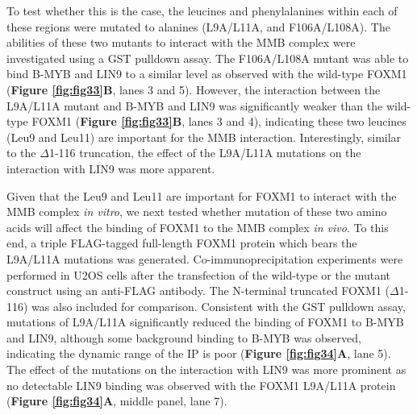 To test whether this is the case, the leucines and phenylalanines within each of these regions were mutated to alanines (L9A/L11A, and F106A/L108A). The abilities of these two mutants to interact with the MMB complex were investigated using a GST pulldown assay. The F106A/L108A mutant was able to bind B-MYB and LIN9 to a similar level as observed with the wild-type FOXM1 (\textbf{Figure \ref{fig:fig33}B}, lanes 3 and 5). However, the interaction between the L9A/L11A mutant and B-MYB and LIN9 was significantly weaker than the wild-type FOXM1 (\textbf{Figure \ref{fig:fig33}B}, lanes 3 and 4), indicating these two leucines (Leu9 and Leu11) are important for the MMB interaction. Interestingly, similar to the $\Delta$1-116 truncation, the effect of the L9A/L11A mutations on the interaction with LIN9 was more apparent.

Given that the Leu9 and Leu11 are important for FOXM1 to interact with the MMB complex \textit{in vitro}, we next tested whether mutation of these two amino acids will affect the binding of FOXM1 to the MMB complex \textit{in vivo}. To this end, a triple FLAG-tagged full-length FOXM1 protein which bears the L9A/L11A mutations was generated. Co-immunoprecipitation experiments were performed in U2OS cells after the transfection of the wild-type or the mutant construct using an anti-FLAG antibody. The N-terminal truncated FOXM1 ($\Delta$1-116) was also included for comparison. Consistent with the GST pulldown assay, mutations of L9A/L11A significantly reduced the binding of FOXM1 to B-MYB and LIN9, although some background binding to B-MYB was observed, indicating the dynamic range of the IP is poor (\textbf{Figure \ref{fig:fig34}A}, lane 5). The effect of the mutations on the interaction with LIN9 was more prominent as no detectable LIN9 binding was observed with the FOXM1 L9A/L11A protein (\textbf{Figure \ref{fig:fig34}A}, middle panel, lane 7).

